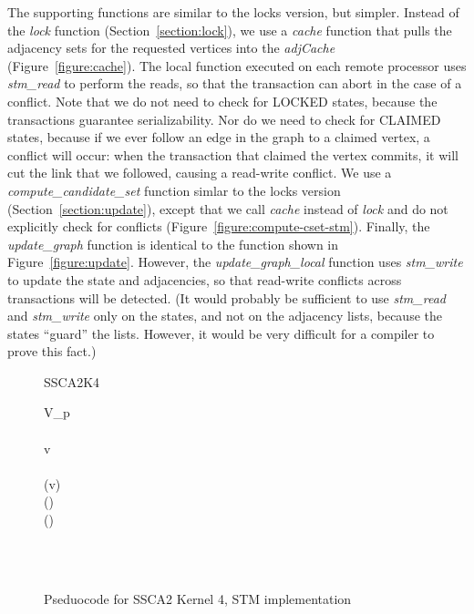 \documentclass[10pt]{article}
\begin{document}
\begin{sloppypar}
The supporting functions are similar to the locks version, but
simpler.  Instead of the \emph{lock} function
(Section~\ref{section:lock}), we use a \emph{cache} function that
pulls the adjacency sets for the requested vertices into the
\emph{adjCache} (Figure~\ref{figure:cache}).  The local function
executed on each remote processor uses \emph{stm\_read} to perform the
reads, so that the transaction can abort in the case of a conflict.
Note that we do not need to check for LOCKED states, because the
transactions guarantee serializability.  Nor do we need to check for
CLAIMED states, because if we ever follow an edge in the graph to a
claimed vertex, a conflict will occur: when the transaction that
claimed the vertex commits, it will cut the link that we followed,
causing a read-write conflict.  We use a
\emph{compute\_candidate\_set} function simlar to the locks version
(Section~\ref{section:update}), except that we call \emph{cache}
instead of \emph{lock} and do not explicitly check for conflicts
(Figure~\ref{figure:compute-cset-stm}).  Finally, the
\emph{update\_graph} function is identical to the function shown in
Figure~\ref{figure:update}.  However, the \emph{update\_graph\_local}
function uses \emph{stm\_write} to update the state and adjacencies,
so that read-write conflicts across transactions will be detected.
(It would probably be sufficient to use \emph{stm\_read} and
\emph{stm\_write} only on the states, and not on the adjacency lists,
because the states ``guard'' the lists.  However, it would be very
difficult for a compiler to prove this fact.)

\begin{center}
\begin{figure}
\begin{algorithm}{SSCA2K4}{}
\\
\begin{FOR}{}
\begin{WHILE}{V_p \neq \emptyset}
 \\
 \leftarrow \emptyset \\
v \leftarrow {} \\
 \\
(v) \\
 \leftarrow {}() \\
() \\
 \\
\end{WHILE}
\end{FOR} \\
\end{algorithm}
\caption{Pseduocode for SSCA2 Kernel 4, STM implementation}
\label{figure:main-stm}
\end{figure}
\end{center}


\end{sloppypar}
\end{document}
